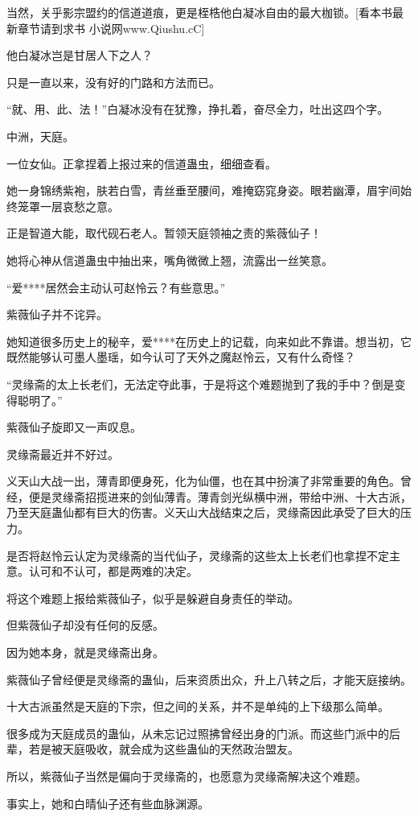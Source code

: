 \begin{this_body}
当然，关乎影宗盟约的信道道痕，更是桎梏他白凝冰自由的最大枷锁。[看本书最新章节请到求书 小说网www.Qiushu.cC]

他白凝冰岂是甘居人下之人？

只是一直以来，没有好的门路和方法而已。

“就、用、此、法！”白凝冰没有在犹豫，挣扎着，奋尽全力，吐出这四个字。

中洲，天庭。

一位女仙。正拿捏着上报过来的信道蛊虫，细细查看。

她一身锦绣紫袍，肤若白雪，青丝垂至腰间，难掩窈窕身姿。眼若幽潭，眉宇间始终笼罩一层哀愁之意。

正是智道大能，取代砚石老人。暂领天庭领袖之责的紫薇仙子！

她将心神从信道蛊虫中抽出来，嘴角微微上翘，流露出一丝笑意。

“爱****居然会主动认可赵怜云？有些意思。”

紫薇仙子并不诧异。

她知道很多历史上的秘辛，爱****在历史上的记载，向来如此不靠谱。想当初，它既然能够认可墨人墨瑶，如今认可了天外之魔赵怜云，又有什么奇怪？

“灵缘斋的太上长老们，无法定夺此事，于是将这个难题抛到了我的手中？倒是变得聪明了。”

紫薇仙子旋即又一声叹息。

灵缘斋最近并不好过。

义天山大战一出，薄青即便身死，化为仙僵，也在其中扮演了非常重要的角色。曾经，便是灵缘斋招揽进来的剑仙薄青。薄青剑光纵横中洲，带给中洲、十大古派，乃至天庭蛊仙都有巨大的伤害。义天山大战结束之后，灵缘斋因此承受了巨大的压力。

是否将赵怜云认定为灵缘斋的当代仙子，灵缘斋的这些太上长老们也拿捏不定主意。认可和不认可，都是两难的决定。

将这个难题上报给紫薇仙子，似乎是躲避自身责任的举动。

但紫薇仙子却没有任何的反感。

因为她本身，就是灵缘斋出身。

紫薇仙子曾经便是灵缘斋的蛊仙，后来资质出众，升上八转之后，才能天庭接纳。

十大古派虽然是天庭的下宗，但之间的关系，并不是单纯的上下级那么简单。

很多成为天庭成员的蛊仙，从未忘记过照拂曾经出身的门派。而这些门派中的后辈，若是被天庭吸收，就会成为这些蛊仙的天然政治盟友。

所以，紫薇仙子当然是偏向于灵缘斋的，也愿意为灵缘斋解决这个难题。

事实上，她和白晴仙子还有些血脉渊源。


\end{this_body}
